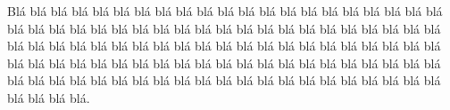\documentclass[
]{book}
\begin{document}
Blá blá blá blá blá blá blá blá blá blá blá blá blá blá blá blá blá blá blá blá blá blá blá blá blá blá blá blá blá blá blá blá blá blá blá blá blá blá blá blá blá blá blá blá blá blá blá blá blá blá blá blá blá blá blá blá blá blá blá blá blá blá blá blá blá blá blá blá blá blá blá blá blá blá blá blá blá blá blá blá blá blá blá blá blá blá blá blá blá blá blá blá blá blá blá blá blá blá blá blá blá blá blá blá blá blá blá blá blá.

  
\end{document}
